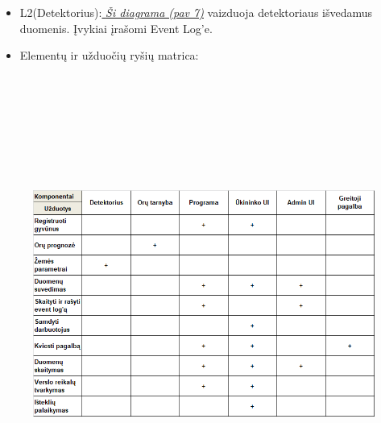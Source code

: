\documentclass[oneside]{VUMIFPSkursinis}
\begin{document}
\begin{itemize}
		\item L2(Detektorius):\hyperref[fig:l2det]{\textit{ Ši diagrama (pav 7)}} vaizduoja detektoriaus išvedamus duomenis. Įvykiai įrašomi Event Log’e.
\end{itemize}
\begin{itemize}
		\item Elementų ir užduočių ryšių matrica:
\end{itemize}
	\begin{figure}[H]
	\centering	
\includegraphics[width=15cm,height=15cm,keepaspectratio]{elementu_ir_uzd_matrica.png}
\caption{}
\label{fig:elementu_ir_uzd_matrica}
\end{figure}

\pagebreak
		
\end{document}
